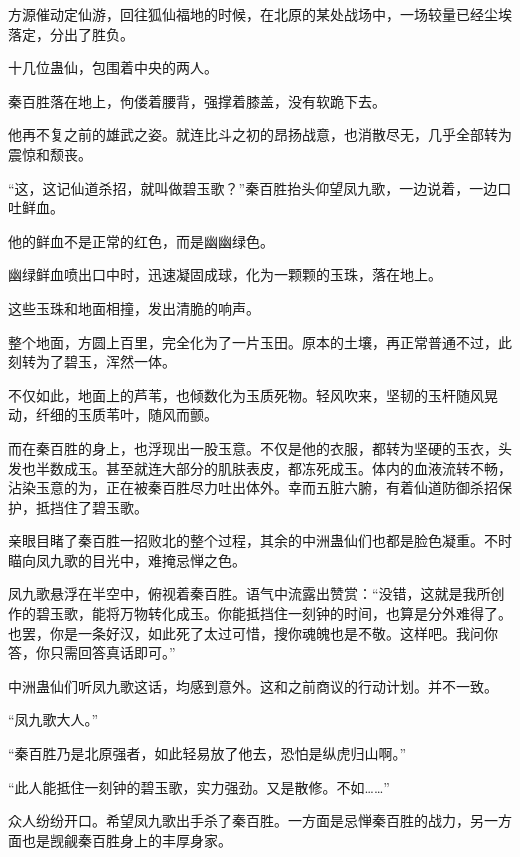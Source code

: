 
\begin{this_body}



方源催动定仙游，回往狐仙福地的时候，在北原的某处战场中，一场较量已经尘埃落定，分出了胜负。

十几位蛊仙，包围着中央的两人。

秦百胜落在地上，佝偻着腰背，强撑着膝盖，没有软跪下去。

他再不复之前的雄武之姿。就连比斗之初的昂扬战意，也消散尽无，几乎全部转为震惊和颓丧。

“这，这记仙道杀招，就叫做碧玉歌？”秦百胜抬头仰望凤九歌，一边说着，一边口吐鲜血。

他的鲜血不是正常的红色，而是幽幽绿色。

幽绿鲜血喷出口中时，迅速凝固成球，化为一颗颗的玉珠，落在地上。

这些玉珠和地面相撞，发出清脆的响声。

整个地面，方圆上百里，完全化为了一片玉田。原本的土壤，再正常普通不过，此刻转为了碧玉，浑然一体。

不仅如此，地面上的芦苇，也倾数化为玉质死物。轻风吹来，坚韧的玉杆随风晃动，纤细的玉质苇叶，随风而颤。

而在秦百胜的身上，也浮现出一股玉意。不仅是他的衣服，都转为坚硬的玉衣，头发也半数成玉。甚至就连大部分的肌肤表皮，都冻死成玉。体内的血液流转不畅，沾染玉意的为，正在被秦百胜尽力吐出体外。幸而五脏六腑，有着仙道防御杀招保护，抵挡住了碧玉歌。

亲眼目睹了秦百胜一招败北的整个过程，其余的中洲蛊仙们也都是脸色凝重。不时瞄向凤九歌的目光中，难掩忌惮之色。

凤九歌悬浮在半空中，俯视着秦百胜。语气中流露出赞赏：“没错，这就是我所创作的碧玉歌，能将万物转化成玉。你能抵挡住一刻钟的时间，也算是分外难得了。也罢，你是一条好汉，如此死了太过可惜，搜你魂魄也是不敬。这样吧。我问你答，你只需回答真话即可。”

中洲蛊仙们听凤九歌这话，均感到意外。这和之前商议的行动计划。并不一致。

“凤九歌大人。”

“秦百胜乃是北原强者，如此轻易放了他去，恐怕是纵虎归山啊。”

“此人能抵住一刻钟的碧玉歌，实力强劲。又是散修。不如……”

众人纷纷开口。希望凤九歌出手杀了秦百胜。一方面是忌惮秦百胜的战力，另一方面也是觊觎秦百胜身上的丰厚身家。


\end{this_body}
